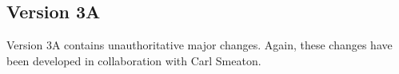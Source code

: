 \documentclass[10pt]{report}
\newcommand{\itemtag}[1]{\item \textbf{Change: #1.}\par}
\begin{document}
\begin{itemize}
    
    
    
    
    

\end{itemize}

\subsection{Version 3A}

Version 3A contains unauthoritative major changes. Again, these changes have been developed in collaboration with Carl Smeaton.
\end{document}
